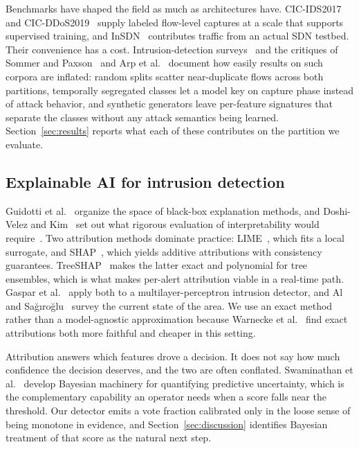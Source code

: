 \documentclass{ieeeaccess}
\begin{document}
Benchmarks have shaped the field as much as architectures have. CIC-IDS2017~\cite{sharafaldin2018cicids} and CIC-DDoS2019~\cite{sharafaldin2019ddos} supply labeled flow-level captures at a scale that supports supervised training, and InSDN~\cite{elsayed2020insdn} contributes traffic from an actual SDN testbed. Their convenience has a cost. Intrusion-detection surveys~\cite{ring2019survey} and the critiques of Sommer and Paxson~\cite{sommer2010outside} and Arp et al.~\cite{arp2022dos} document how easily results on such corpora are inflated: random splits scatter near-duplicate flows across both partitions, temporally segregated classes let a model key on capture phase instead of attack behavior, and synthetic generators leave per-feature signatures that separate the classes without any attack semantics being learned. Section~\ref{sec:results} reports what each of these contributes on the partition we evaluate.

\subsection{Explainable AI for intrusion detection}
Guidotti et al.~\cite{guidotti2018survey} organize the space of black-box explanation methods, and Doshi-Velez and Kim~\cite{doshivelez2017rigorous} set out what rigorous evaluation of interpretability would require~\cite{arrieta2020xai}. Two attribution methods dominate practice: LIME~\cite{ribeiro2016lime}, which fits a local surrogate, and SHAP~\cite{lundberg2017shap}, which yields additive attributions with consistency guarantees. TreeSHAP~\cite{lundberg2020treeshap} makes the latter exact and polynomial for tree ensembles, which is what makes per-alert attribution viable in a real-time path. Gaspar et al.~\cite{gaspar2024xai} apply both to a multilayer-perceptron intrusion detector, and Al and Sa\u{g}{\i}ro\u{g}lu~\cite{samed2025xaiids} survey the current state of the area. We use an exact method rather than a model-agnostic approximation because Warnecke et al.~\cite{warnecke2020evaluating} find exact attributions both more faithful and cheaper in this setting.

Attribution answers which features drove a decision. It does not say how much confidence the decision deserves, and the two are often conflated. Swaminathan et al.~\cite{swaminathan2022bayesian} develop Bayesian machinery for quantifying predictive uncertainty, which is the complementary capability an operator needs when a score falls near the threshold. Our detector emits a vote fraction calibrated only in the loose sense of being monotone in evidence, and Section~\ref{sec:discussion} identifies Bayesian treatment of that score as the natural next step.
\end{document}
